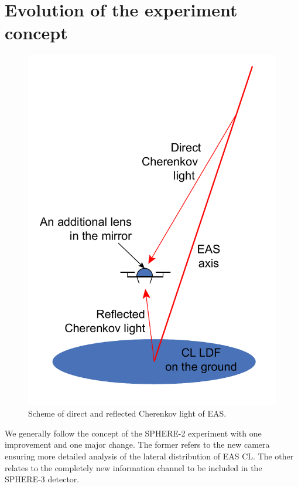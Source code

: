 \documentclass[a4paper,11pt]{article}
\begin{document}
\section{Evolution of the experiment concept}

\begin{figure}[t]
\centering %
\includegraphics[height=.35\textheight]{DirectCL.pdf}
\caption{Scheme of direct and reflected Cherenkov light of EAS.}
\label{fig:DirectCL}
\end{figure}

We generally follow the concept of the SPHERE-2 experiment with one improvement and one major change. The former refers to the new camera ensuring more detailed analysis of the lateral distribution of EAS CL. The other relates to the completely new information channel to be included in the SPHERE-3 detector.
\end{document}
